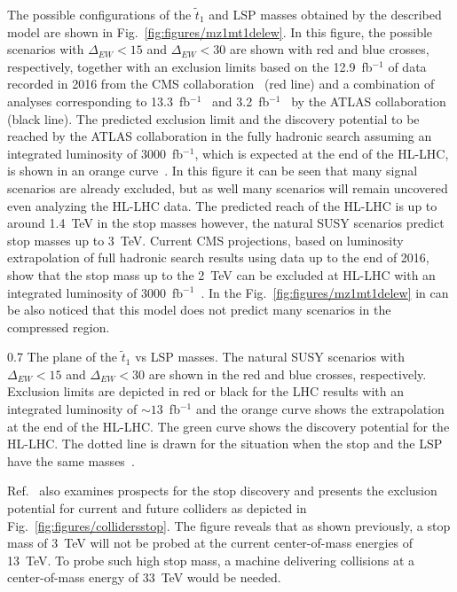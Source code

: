 The possible configurations of the $\tilde{t}_{1}$ and LSP masses obtained by the described model are shown in Fig.~\ref{fig:figures/mz1mt1delew}. In this figure, the possible scenarios with $\Delta_{EW} <15$ and $\Delta_{EW} <30$ are shown with red and blue crosses, respectively, together with an exclusion limits based on the 12.9~fb$^{-1}$ of data recorded in  2016 from the CMS collaboration~\cite{CMS:2016hxa} (red line) and a combination of analyses corresponding to 13.3~fb$^{-1}$~\cite{ATLAS:2016jaa, ATLAS:2016ljb, ATLAS:2016xcm} and  3.2~fb$^{-1}$~\cite{Aaboud:2016tnv}  by the ATLAS collaboration (black line). The predicted exclusion limit and the discovery potential to be reached by the ATLAS collaboration in the fully hadronic search assuming an integrated luminosity of $3000$~fb$^{-1}$, which is expected at the end of the  HL-LHC, is shown in an orange curve~\cite{ATL-PHYS-PUB-2013-011}. In this figure it can be seen that many signal scenarios are already excluded, but as well many scenarios will remain uncovered even analyzing the HL-LHC data. The predicted reach of the HL-LHC is up to around 1.4~TeV in the stop masses however, the natural SUSY scenarios predict stop masses up to 3~TeV. Current CMS projections, based on luminosity extrapolation of full hadronic search results using data up to the end of 2016, show that the stop mass up to the 2~TeV can be excluded at HL-LHC with an integrated luminosity of 3000~fb$^{-1}$~\cite{website:moriond}. In the Fig.~\ref{fig:figures/mz1mt1delew} in can be also noticed that this model does not predict many scenarios in the compressed region.  

                 {0.7}       %
                 { The plane of the $\tilde{t}_{1}$ vs LSP masses. The natural SUSY scenarios with $\Delta_{EW} <15$ and $\Delta_{EW} <30$ are shown in the red and blue crosses, respectively. Exclusion limits are depicted in red or black for the LHC results with an integrated luminosity of $\sim 13$~fb$^{-1}$ and the orange curve shows the extrapolation at the end of the HL-LHC. The green curve shows the discovery potential for the HL-LHC. The dotted line is drawn for the situation when the stop and the LSP have the same masses~\cite{Baer:2016bwh}.   }

Ref.~\cite{Baer:2016bwh} also examines prospects for the stop discovery and presents the exclusion potential for current and future colliders as depicted in Fig.~\ref{fig:figures/collidersstop}. The figure reveals that as shown previously, a stop mass of 3~TeV will not be probed at the current center-of-mass energies of 13~TeV. To probe such high stop mass, a machine delivering collisions at a center-of-mass energy of 33~TeV would be needed. 

